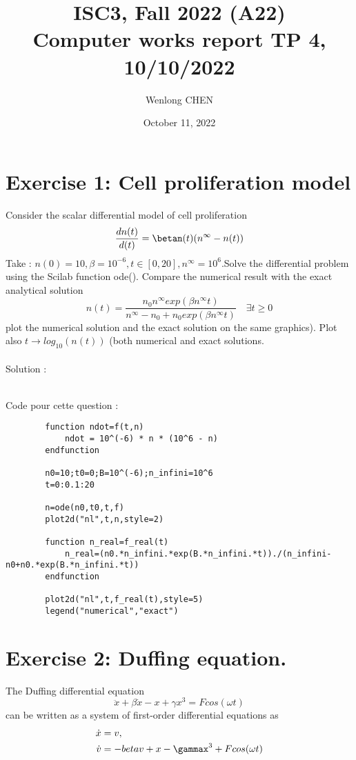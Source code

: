 \documentclass[11pt]{article}
\title{ISC3, Fall 2022 (A22) \\
 Computer works report TP 4, 10/10/2022}
\author{Wenlong CHEN}
\date{October 11, 2022}
\begin{document}
    \maketitle
    \section*{Exercise 1: Cell proliferation model}
    Consider the scalar differential model of cell proliferation\\
    \[\frac{dn(t)}{d(t)}=\betan(t)(n^\infty-n(t))\]
    Take : $n(0)=10, \beta=10^{-6},t\in[0,20],n^\infty=10^6$.Solve the differential problem using the Scilab function ode(). Compare the numerical result with the exact analytical solution\\
    \[n(t)=\frac{n_0n^\infty exp(\beta n^\infty t)}{n^\infty-n_0+n_0exp(\beta n^\infty t)} \quad \exists t\ge 0\]
    plot the numerical solution and the exact solution on the same graphics). Plot also $t\rightarrow log_{10}(n(t))$ (both numerical and exact solutions.\\
    ~\\
    Solution : 


    ~\\
    Code pour cette question :
    \begin{verbatim}
        function ndot=f(t,n)
            ndot = 10^(-6) * n * (10^6 - n)
        endfunction

        n0=10;t0=0;B=10^(-6);n_infini=10^6
        t=0:0.1:20

        n=ode(n0,t0,t,f)
        plot2d("nl",t,n,style=2)

        function n_real=f_real(t)
            n_real=(n0.*n_infini.*exp(B.*n_infini.*t))./(n_infini-n0+n0.*exp(B.*n_infini.*t))
        endfunction

        plot2d("nl",t,f_real(t),style=5)
        legend("numerical","exact")
    \end{verbatim}
    
    
    \section*{Exercise 2: Duffing equation.}
    The Duffing differential equation
    \[\ddot{x}+\beta \dot{x}-x+\gamma x^3=Fcos(\omega t)\]
    can be written as a system of first-order differential equations as
    $$
    \begin{align*}
        \dot{x}&=v,\\
        \dot{v}&=-beta v+x-\gammax^3+Fcos(\omega t)
    \end{align*}
    $$
\end{document}
